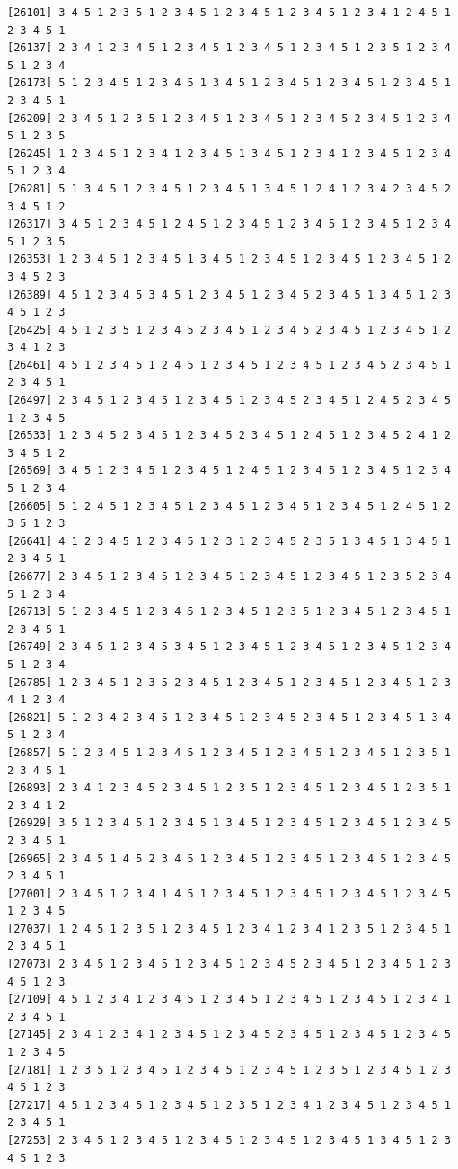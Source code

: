 \documentclass[
  english,
]{book}
\begin{document}
\begin{verbatim}
[26101] 3 4 5 1 2 3 5 1 2 3 4 5 1 2 3 4 5 1 2 3 4 5 1 2 3 4 1 2 4 5 1 2 3 4 5 1
[26137] 2 3 4 1 2 3 4 5 1 2 3 4 5 1 2 3 4 5 1 2 3 4 5 1 2 3 5 1 2 3 4 5 1 2 3 4
[26173] 5 1 2 3 4 5 1 2 3 4 5 1 3 4 5 1 2 3 4 5 1 2 3 4 5 1 2 3 4 5 1 2 3 4 5 1
[26209] 2 3 4 5 1 2 3 5 1 2 3 4 5 1 2 3 4 5 1 2 3 4 5 2 3 4 5 1 2 3 4 5 1 2 3 5
[26245] 1 2 3 4 5 1 2 3 4 1 2 3 4 5 1 3 4 5 1 2 3 4 1 2 3 4 5 1 2 3 4 5 1 2 3 4
[26281] 5 1 3 4 5 1 2 3 4 5 1 2 3 4 5 1 3 4 5 1 2 4 1 2 3 4 2 3 4 5 2 3 4 5 1 2
[26317] 3 4 5 1 2 3 4 5 1 2 4 5 1 2 3 4 5 1 2 3 4 5 1 2 3 4 5 1 2 3 4 5 1 2 3 5
[26353] 1 2 3 4 5 1 2 3 4 5 1 3 4 5 1 2 3 4 5 1 2 3 4 5 1 2 3 4 5 1 2 3 4 5 2 3
[26389] 4 5 1 2 3 4 5 3 4 5 1 2 3 4 5 1 2 3 4 5 2 3 4 5 1 3 4 5 1 2 3 4 5 1 2 3
[26425] 4 5 1 2 3 5 1 2 3 4 5 2 3 4 5 1 2 3 4 5 2 3 4 5 1 2 3 4 5 1 2 3 4 1 2 3
[26461] 4 5 1 2 3 4 5 1 2 4 5 1 2 3 4 5 1 2 3 4 5 1 2 3 4 5 2 3 4 5 1 2 3 4 5 1
[26497] 2 3 4 5 1 2 3 4 5 1 2 3 4 5 1 2 3 4 5 2 3 4 5 1 2 4 5 2 3 4 5 1 2 3 4 5
[26533] 1 2 3 4 5 2 3 4 5 1 2 3 4 5 2 3 4 5 1 2 4 5 1 2 3 4 5 2 4 1 2 3 4 5 1 2
[26569] 3 4 5 1 2 3 4 5 1 2 3 4 5 1 2 4 5 1 2 3 4 5 1 2 3 4 5 1 2 3 4 5 1 2 3 4
[26605] 5 1 2 4 5 1 2 3 4 5 1 2 3 4 5 1 2 3 4 5 1 2 3 4 5 1 2 4 5 1 2 3 5 1 2 3
[26641] 4 1 2 3 4 5 1 2 3 4 5 1 2 3 1 2 3 4 5 2 3 5 1 3 4 5 1 3 4 5 1 2 3 4 5 1
[26677] 2 3 4 5 1 2 3 4 5 1 2 3 4 5 1 2 3 4 5 1 2 3 4 5 1 2 3 5 2 3 4 5 1 2 3 4
[26713] 5 1 2 3 4 5 1 2 3 4 5 1 2 3 4 5 1 2 3 5 1 2 3 4 5 1 2 3 4 5 1 2 3 4 5 1
[26749] 2 3 4 5 1 2 3 4 5 3 4 5 1 2 3 4 5 1 2 3 4 5 1 2 3 4 5 1 2 3 4 5 1 2 3 4
[26785] 1 2 3 4 5 1 2 3 5 2 3 4 5 1 2 3 4 5 1 2 3 4 5 1 2 3 4 5 1 2 3 4 1 2 3 4
[26821] 5 1 2 3 4 2 3 4 5 1 2 3 4 5 1 2 3 4 5 2 3 4 5 1 2 3 4 5 1 3 4 5 1 2 3 4
[26857] 5 1 2 3 4 5 1 2 3 4 5 1 2 3 4 5 1 2 3 4 5 1 2 3 4 5 1 2 3 5 1 2 3 4 5 1
[26893] 2 3 4 1 2 3 4 5 2 3 4 5 1 2 3 5 1 2 3 4 5 1 2 3 4 5 1 2 3 5 1 2 3 4 1 2
[26929] 3 5 1 2 3 4 5 1 2 3 4 5 1 3 4 5 1 2 3 4 5 1 2 3 4 5 1 2 3 4 5 2 3 4 5 1
[26965] 2 3 4 5 1 4 5 2 3 4 5 1 2 3 4 5 1 2 3 4 5 1 2 3 4 5 1 2 3 4 5 2 3 4 5 1
[27001] 2 3 4 5 1 2 3 4 1 4 5 1 2 3 4 5 1 2 3 4 5 1 2 3 4 5 1 2 3 4 5 1 2 3 4 5
[27037] 1 2 4 5 1 2 3 5 1 2 3 4 5 1 2 3 4 1 2 3 4 1 2 3 5 1 2 3 4 5 1 2 3 4 5 1
[27073] 2 3 4 5 1 2 3 4 5 1 2 3 4 5 1 2 3 4 5 2 3 4 5 1 2 3 4 5 1 2 3 4 5 1 2 3
[27109] 4 5 1 2 3 4 1 2 3 4 5 1 2 3 4 5 1 2 3 4 5 1 2 3 4 5 1 2 3 4 1 2 3 4 5 1
[27145] 2 3 4 1 2 3 4 1 2 3 4 5 1 2 3 4 5 2 3 4 5 1 2 3 4 5 1 2 3 4 5 1 2 3 4 5
[27181] 1 2 3 5 1 2 3 4 5 1 2 3 4 5 1 2 3 4 5 1 2 3 5 1 2 3 4 5 1 2 3 4 5 1 2 3
[27217] 4 5 1 2 3 4 5 1 2 3 4 5 1 2 3 5 1 2 3 4 1 2 3 4 5 1 2 3 4 5 1 2 3 4 5 1
[27253] 2 3 4 5 1 2 3 4 5 1 2 3 4 5 1 2 3 4 5 1 2 3 4 5 1 3 4 5 1 2 3 4 5 1 2 3

\end{verbatim}
\end{document}
